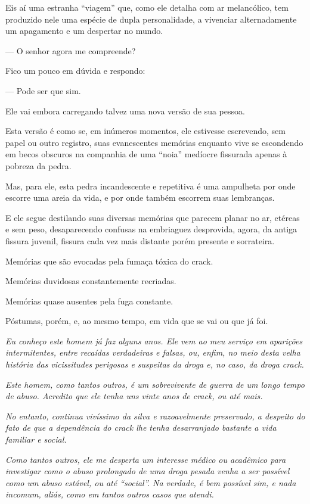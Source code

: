 Eis aí uma estranha ``viagem'' que, como ele detalha com ar melancólico,
tem produzido nele uma espécie de dupla personalidade, a vivenciar
alternadamente um apagamento e um despertar no mundo.

— O senhor agora me compreende?

Fico um pouco em dúvida e respondo:

— Pode ser que sim.

Ele vai embora carregando talvez uma nova versão de sua pessoa.

Esta versão é como se, em inúmeros momentos, ele estivesse escrevendo,
sem papel ou outro registro, suas evanescentes memórias enquanto vive se
escondendo em becos obscuros na companhia de uma ``noia'' medíocre
fissurada apenas à pobreza da pedra.

Mas, para ele, esta pedra incandescente e repetitiva é uma ampulheta por
onde escorre uma areia da vida, e por onde também escorrem suas
lembranças.

E ele segue destilando suas diversas memórias que parecem planar no ar,
etéreas e sem peso, desaparecendo confusas na embriaguez desprovida,
agora, da antiga fissura juvenil, fissura cada vez mais distante porém
presente e sorrateira.

Memórias que são evocadas pela fumaça tóxica do crack.

Memórias duvidosas constantemente recriadas.

Memórias quase ausentes pela fuga constante.

Póstumas, porém, e, ao mesmo tempo, em vida que se vai ou que já foi.

\begin{center}\asterisc{}\end{center}
\begingroup\small

\emph{Eu conheço este homem já faz alguns anos. Ele vem ao meu serviço
em aparições intermitentes, entre recaídas verdadeiras e falsas, ou,
enfim, no meio desta velha história das vicissitudes perigosas e
suspeitas da droga e, no caso, da droga crack.}

\emph{Este homem, como tantos outros, é um sobrevivente de guerra de um
longo tempo de abuso. Acredito que ele tenha uns vinte anos de crack, ou
até mais.}

\emph{No entanto, continua vivíssimo da silva e razoavelmente
preservado, a despeito do fato de que a dependência do crack lhe tenha
desarranjado bastante a vida familiar e social.}

\emph{Como tantos outros, ele me desperta um interesse médico ou
acadêmico para investigar como o abuso prolongado de uma droga pesada
venha a ser possível como um abuso estável, ou até ``social''. Na
verdade, é bem possível sim, e nada incomum, aliás, como em tantos outros
casos que atendi.}

